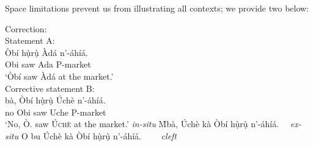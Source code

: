 \documentclass[output=paper,colorlinks,citecolor=brown]{langscibook}
\begin{document}
Space limitations prevent us from illustrating all contexts; we provide two below:


\ea%
    \label{ex:amaechi:9}
    Correction:\\\vspace*{-0.2cm}
    \ea\label{ex:amaechi:9a}
    Statement A:\\
    \gll    Òbí hụ̀rụ̀ Àdá n'-áhíá.\\
            Obi saw Ada P-market\\
    \glt    `Òbí saw {Àdá} at the market.'\\
    \ex\label{ex:amaechi:9b}
    Corrective statement B:\\
        \ea\label{ex:amaechi:9bi}
        bà, Òbí hụ̀rụ̀ Úchè n'-áhíá.\\
                no Obi saw Uche P-market\\
        \glt    `No, Ò. saw \textsc{Úchè} at the market.' \textit{in-situ}
        \ex\label{ex:amaechi:9bii}
                {\`M}bà, Úchè kà Òbí hụ̀rụ̀   n'-áhíá. ~~\textit{ex-situ}
        \ex\label{ex:amaechi:9biii}
                O bu Úchè kà Òbí hụ̀rụ̀   n'-áhíá. ~~~~\textit{cleft}
        \z
    \z
\z
\end{document}
